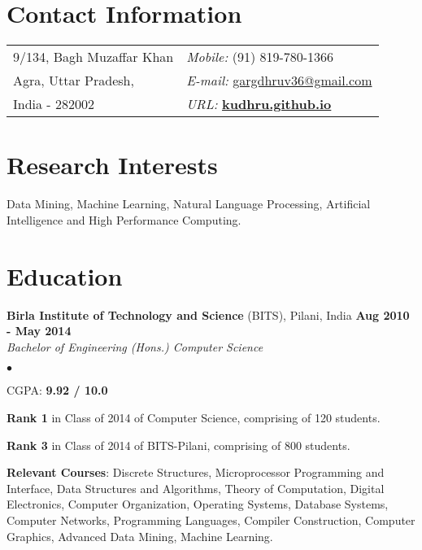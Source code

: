 \documentclass[margin,line]{res}
\newenvironment{list2}{
  \begin{list}{$\bullet$}{%
      \setlength{\itemsep}{0in}
      \setlength{\parsep}{0in} \setlength{\parskip}{0in}
      \setlength{\topsep}{0in} \setlength{\partopsep}{0in} 
      \setlength{\leftmargin}{0.2in}}}{\end{list}}
\begin{document}

\begin{resume}
\section{\sc Contact Information}
\vspace{.05in}
\begin{tabular}{@{}p{3in}p{4in}}
9/134, Bagh Muzaffar Khan         & {\it Mobile:}  (91) 819-780-1366 \\            
 Agra, Uttar Pradesh, & {\it E-mail:}  \href{mailto:gargdhruv36@gmail.com }{gargdhruv36@gmail.com }\\
 India - 282002 &{\it URL:}  \href{http://kudhru.github.io}{\bf kudhru.github.io}
\end{tabular}


\section{\sc Research Interests}
Data Mining, Machine Learning, Natural Language Processing, Artificial Intelligence and High Performance Computing.

\section{\sc Education}
{\bf Birla Institute of Technology and Science} (BITS), Pilani, India \hfill {\bf {Aug 2010 - May 2014}}\\
{\em Bachelor of Engineering (Hons.) Computer Science }
\vspace*{.3cm}
\begin{list2}
\item CGPA:  {\bf {9.92 / 10.0}}
\item {\bf Rank 1} in Class of 2014 of Computer Science, comprising of 120 students. 
\item {\bf Rank 3} in Class of 2014 of BITS-Pilani, comprising of 800 students.
\item {\bf Relevant Courses}: Discrete Structures, Microprocessor Programming
and Interface, Data Structures and Algorithms, Theory of Computation, Digital Electronics,
Computer Organization, Operating Systems, Database Systems, Computer Networks,
Programming Languages, Compiler Construction, Computer Graphics, Advanced Data Mining, Machine Learning.


\end{list2}
\end{resume}
\end{document}
